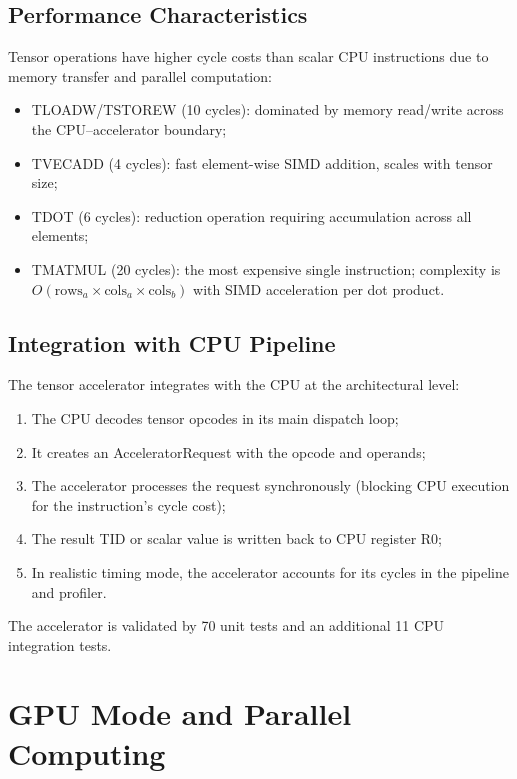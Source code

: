 \documentclass[12pt,a4paper,twoside]{book}
\theoremstyle{trinarytheorem}
\theoremstyle{trinarydefinition}
\newcommand{\code}[1]{\textsf{#1}}
\begin{document}
\section{Performance Characteristics}

Tensor operations have higher cycle costs than scalar CPU instructions due to
memory transfer and parallel computation:
\begin{itemize}
    \item TLOADW/TSTOREW (10 cycles): dominated by memory read/write across the
          CPU--accelerator boundary;
    \item TVECADD (4 cycles): fast element-wise SIMD addition, scales with tensor
          size;
    \item TDOT (6 cycles): reduction operation requiring accumulation across all
          elements;
    \item TMATMUL (20 cycles): the most expensive single instruction; complexity is
          $O(\text{rows}_a \times \text{cols}_a \times \text{cols}_b)$ with SIMD
          acceleration per dot product.
\end{itemize}

\section{Integration with CPU Pipeline}

The tensor accelerator integrates with the CPU at the architectural level:
\begin{enumerate}
    \item The CPU decodes tensor opcodes in its main dispatch loop;
    \item It creates an \code{AcceleratorRequest} with the opcode and operands;
    \item The accelerator processes the request synchronously (blocking CPU
          execution for the instruction's cycle cost);
    \item The result TID or scalar value is written back to CPU register R0;
    \item In realistic timing mode, the accelerator accounts for its cycles in
          the pipeline and profiler.
\end{enumerate}

The accelerator is validated by 70 unit tests and an additional 11 CPU integration
tests.

\chapter{GPU Mode and Parallel Computing}
\label{ch:gpu}
\end{document}

